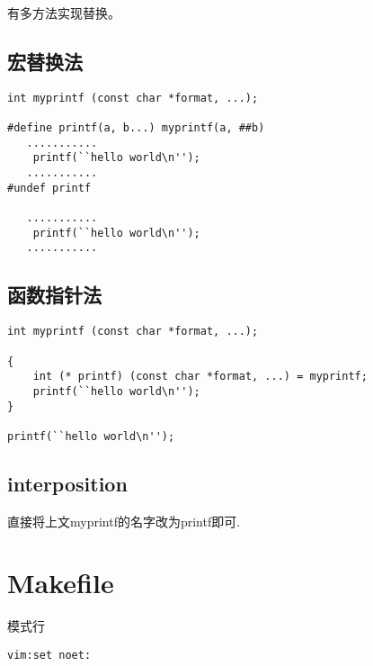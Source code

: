 有多方法实现替换。
\subsection{宏替换法}
\begin{verbatim}
int myprintf (const char *format, ...);

#define printf(a, b...) myprintf(a, ##b)
   ...........
    printf(``hello world\n'');
   ...........
#undef printf

   ...........
    printf(``hello world\n'');
   ...........
\end{verbatim}

\subsection{函数指针法}
\begin{verbatim}
int myprintf (const char *format, ...);

{
    int (* printf) (const char *format, ...) = myprintf;
    printf(``hello world\n'');
}

printf(``hello world\n'');
\end{verbatim}


\subsection{interposition}
直接将上文myprintf的名字改为printf即可.


\section{Makefile}

模式行
\begin{verbatim}
vim:set noet:
\end{verbatim}

